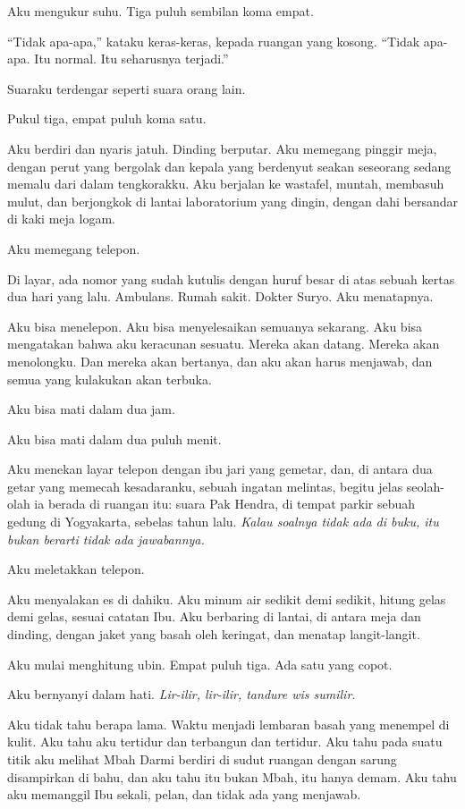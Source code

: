 \documentclass[11pt,twoside,openany]{book}
\begin{document}
Aku mengukur suhu. Tiga puluh sembilan koma empat.

``Tidak apa-apa,'' kataku keras-keras, kepada ruangan yang kosong. ``Tidak apa-apa. Itu normal. Itu seharusnya terjadi.''

Suaraku terdengar seperti suara orang lain.

Pukul tiga, empat puluh koma satu.

Aku berdiri dan nyaris jatuh. Dinding berputar. Aku memegang pinggir meja, dengan perut yang bergolak dan kepala yang berdenyut seakan seseorang sedang memalu dari dalam tengkorakku. Aku berjalan ke wastafel, muntah, membasuh mulut, dan berjongkok di lantai laboratorium yang dingin, dengan dahi bersandar di kaki meja logam.

Aku memegang telepon.

Di layar, ada nomor yang sudah kutulis dengan huruf besar di atas sebuah kertas dua hari yang lalu. Ambulans. Rumah sakit. Dokter Suryo. Aku menatapnya.

Aku bisa menelepon. Aku bisa menyelesaikan semuanya sekarang. Aku bisa mengatakan bahwa aku keracunan sesuatu. Mereka akan datang. Mereka akan menolongku. Dan mereka akan bertanya, dan aku akan harus menjawab, dan semua yang kulakukan akan terbuka.

Aku bisa mati dalam dua jam.

Aku bisa mati dalam dua puluh menit.

Aku menekan layar telepon dengan ibu jari yang gemetar, dan, di antara dua getar yang memecah kesadaranku, sebuah ingatan melintas, begitu jelas seolah-olah ia berada di ruangan itu: suara Pak Hendra, di tempat parkir sebuah gedung di Yogyakarta, sebelas tahun lalu. \emph{Kalau soalnya tidak ada di buku, itu bukan berarti tidak ada jawabannya.}

Aku meletakkan telepon.

Aku menyalakan es di dahiku. Aku minum air sedikit demi sedikit, hitung gelas demi gelas, sesuai catatan Ibu. Aku berbaring di lantai, di antara meja dan dinding, dengan jaket yang basah oleh keringat, dan menatap langit-langit.

Aku mulai menghitung ubin. Empat puluh tiga. Ada satu yang copot.

Aku bernyanyi dalam hati. \emph{Lir-ilir, lir-ilir, tandure wis sumilir.}

Aku tidak tahu berapa lama. Waktu menjadi lembaran basah yang menempel di kulit. Aku tahu aku tertidur dan terbangun dan tertidur. Aku tahu pada suatu titik aku melihat Mbah Darmi berdiri di sudut ruangan dengan sarung disampirkan di bahu, dan aku tahu itu bukan Mbah, itu hanya demam. Aku tahu aku memanggil Ibu sekali, pelan, dan tidak ada yang menjawab.
\end{document}
